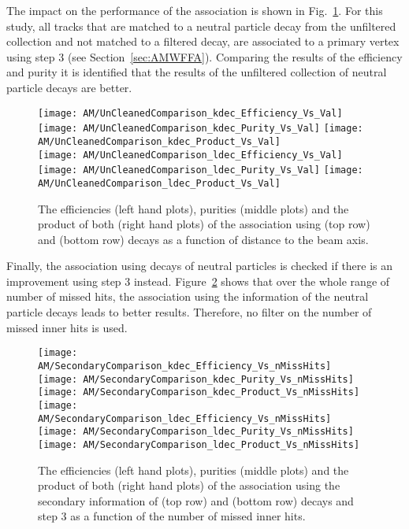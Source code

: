 The impact on the performance of the association is shown in Fig.~\ref{plot:AMWFSVdecEffAndPurRT}. For this study, all tracks that are matched to a neutral particle decay from the unfiltered collection and not matched to a filtered decay, are associated to a primary vertex using step 3 (see Section~\ref{sec:AMWFFA}). Comparing the results of the efficiency and purity it is identified that the results of the unfiltered collection of neutral particle decays are better.

\begin{figure}[t]
    \centering
    \texttt{[image: AM/UnCleanedComparison\_kdec\_Efficiency\_Vs\_Val]}
    \texttt{[image: AM/UnCleanedComparison\_kdec\_Purity\_Vs\_Val]}
    \texttt{[image: AM/UnCleanedComparison\_kdec\_Product\_Vs\_Val]}
    \\
    \texttt{[image: AM/UnCleanedComparison\_ldec\_Efficiency\_Vs\_Val]}
    \texttt{[image: AM/UnCleanedComparison\_ldec\_Purity\_Vs\_Val]}
    \texttt{[image: AM/UnCleanedComparison\_ldec\_Product\_Vs\_Val]}
    \caption[Efficiencies, purities and their product of the association using different \PKzS{} and \PgL{} decay collections as a function of distance to the beam axis]{The efficiencies (left hand plots), purities (middle plots) and the product of both (right hand plots) of the association using \PKzS{} (top row) and \PgL{} (bottom row) decays as a function of distance to the beam axis. \label{plot:AMWFSVdecEffAndPurRT}}
\end{figure}

Finally, the association using decays of neutral particles is checked if there is an improvement using step 3 instead. Figure~\ref{plot:AMWFSVdecEffAndPurVsFA} shows that over the whole range of number of missed hits, the association using the information of the neutral particle decays leads to better results. Therefore, no filter on the number of missed inner hits is used.

\begin{figure}[t]
    \centering
    \texttt{[image: AM/SecondaryComparison\_kdec\_Efficiency\_Vs\_nMissHits]}
    \texttt{[image: AM/SecondaryComparison\_kdec\_Purity\_Vs\_nMissHits]}
    \texttt{[image: AM/SecondaryComparison\_kdec\_Product\_Vs\_nMissHits]}
    \\
    \texttt{[image: AM/SecondaryComparison\_ldec\_Efficiency\_Vs\_nMissHits]}
    \texttt{[image: AM/SecondaryComparison\_ldec\_Purity\_Vs\_nMissHits]}
    \texttt{[image: AM/SecondaryComparison\_ldec\_Product\_Vs\_nMissHits]}
    \caption[Efficiencies, purities and their product of the association using \PKzS{} and \PgL{} decays \vs{} step 3 as a function of missed inner hits]{The efficiencies (left hand plots), purities (middle plots) and the product of both (right hand plots) of the association using the secondary information of \PKzS{} (top row) and \PgL{} (bottom row) decays and step 3 as a function of the number of missed inner hits.\label{plot:AMWFSVdecEffAndPurVsFA}}
\end{figure}


